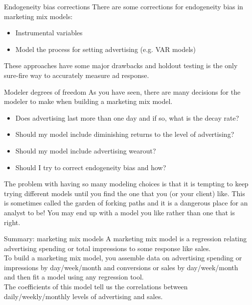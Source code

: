 \documentclass[10pt, aspectratio=169]{beamer}
\begin{document}
\begin{frame}{Endogeneity bias corrections}
There are some corrections for endogeneity bias in marketing mix models: 
\begin{itemize}
\item Instrumental variables
\item Model the process for setting advertising (e.g. VAR models)
\end{itemize}
\bigskip \pause
These approaches have some major drawbacks and \alert{holdout testing} is the only sure-fire way to accurately measure ad response. 
\end{frame} 

\begin{frame}{Modeler degrees of freedom}
As you have seen, there are many decisions for the modeler to make when building a marketing mix model. 
\begin{itemize}
\item Does advertising last more than one day and if so, what is the \alert{decay rate}? 
\item Should my model include \alert{diminishing returns} to the level of advertising?
\item Should my model include advertising \alert{wearout}? 
\item Should I try to \alert{correct endogeneity bias} and how? 
\end{itemize}
\bigskip \pause
The problem with having so many modeling choices is that it is tempting to keep trying different models until you find the one that you (or your client) like. This is sometimes called the \alert{garden of forking paths} and it is a dangerous place for an analyst to be! You may end up with a model you like rather than one that is right. 
\end{frame}

\begin{frame}{Summary: marketing mix models}
A \alert{marketing mix model} is a \alert{regression} relating advertising spending or total impressions to some response like sales. \\
\bigskip
To build a marketing mix model, you assemble data on advertising spending or impressions by day/week/month and conversions or sales by day/week/month and then fit a model using any regression tool.   \\
\bigskip
The coefficients of this model tell us the correlations between daily/weekly/monthly levels of advertising and sales.\\
\end{frame}
\end{document}
